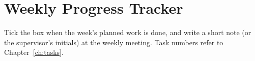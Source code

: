 \chapter{Weekly Progress Tracker}
\label{ch:tracker}

Tick the box when the week's planned work is done, and write a short note (or the
supervisor's initials) at the weekly meeting. Task numbers refer to
Chapter~\ref{ch:tasks}.

\begin{progresstracker}
\end{progresstracker}
